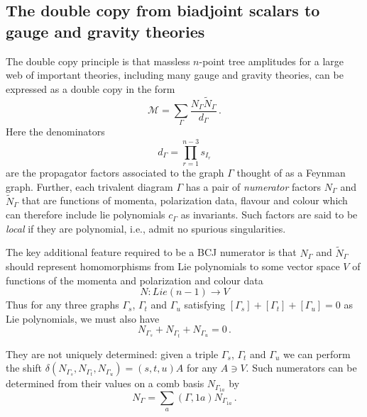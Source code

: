 \documentclass[11pt]{article}
\newcommand{\cM}{\mathcal{M}}
\newcommand{\1}{{\rm 1\hskip-0.25em I}}
\begin{document}
\subsection{The double copy from biadjoint scalars to gauge and gravity theories}
The double copy principle is that massless $n$-point tree amplitudes for a large web of important  theories, including many gauge and gravity theories,  can be expressed as a double copy in the form
\begin{equation}
\cM=\sum_\Gamma \frac{N_\Gamma \tilde N_\Gamma}{d_\Gamma}\, .
\end{equation}
Here the denominators
\begin{equation}
d_\Gamma=\prod _{r=1}^{n-3} s_{I_r}
\end{equation}
are the propagator factors associated to the graph $\Gamma$ thought of as a Feynman graph.   Further,  each trivalent diagram $\Gamma$ has a pair of \emph{numerator}  factors   $N_\Gamma$ and $\tilde N_\Gamma$ that are functions of momenta, polarization data, flavour and colour which can therefore include lie polynomials $c_\Gamma$  as invariants.  Such factors are said to be \emph{local} if they are polynomial, i.e., admit no spurious singularities.  

 
The key additional feature required to be a BCJ numerator is that $N_\Gamma$ and $\tilde N_\Gamma$ should represent homomorphisms from  Lie polynomials  to some vector space $V$  of functions of the momenta and polarization and colour data
\begin{equation}
N:Lie(n-1)\rightarrow V
\end{equation}
Thus  for any three graphs $\Gamma_s$, $\Gamma_t$ and $\Gamma_u$ satisfying $[\Gamma_s]+[\Gamma_t]+[\Gamma_u]=0$ as Lie polynomials, we must also have
\begin{equation}
N_{\Gamma_s}+N_{\Gamma_t}+N_{\Gamma_u}=0\, .\label{num-Lie}
\end{equation}

 They are not uniquely determined: given a triple $\Gamma_s$, $\Gamma_t$ and $\Gamma_u$ we can perform the shift 
 $\delta(N_{\Gamma_s}, N_{\Gamma_t}, N_{\Gamma_u})=(s,t,u)A$ for any $A\ni V$.  Such numerators can  be determined from their values on a comb basis $N_{\Gamma_{1a}}$ by
\begin{equation}
N_\Gamma =\sum_{a} (\Gamma ,1a) N_{\Gamma_{1a}}\, .\label{N-basis}
\end{equation}
\end{document}
